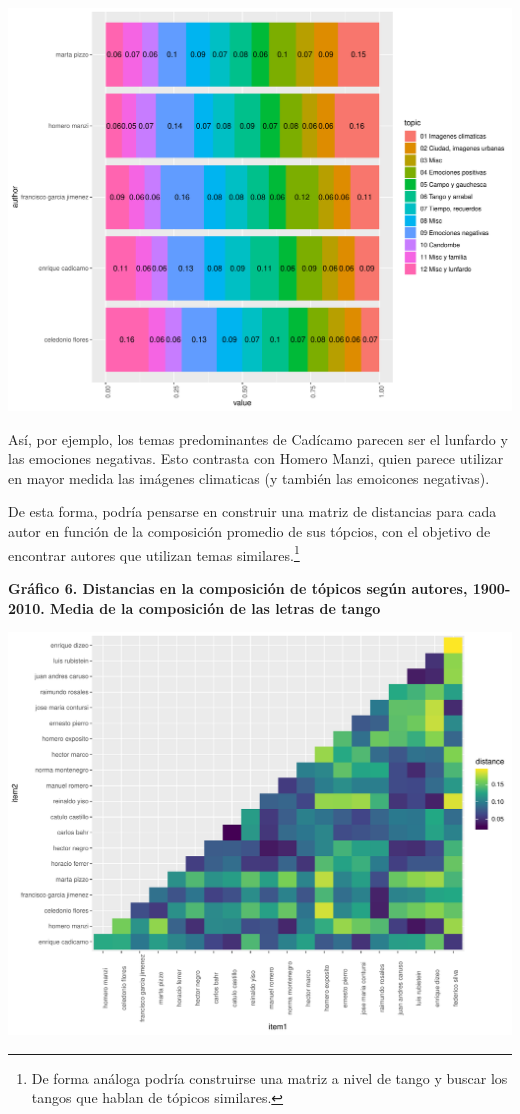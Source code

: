 \documentclass[]{article}
\let\rmarkdownfootnote\footnote%
\def\footnote{\protect\rmarkdownfootnote}
\begin{document}
\includegraphics{Notebook_files/figure-latex/unnamed-chunk-5-1.pdf}

Así, por ejemplo, los temas predominantes de Cadícamo parecen ser el
lunfardo y las emociones negativas. Esto contrasta con Homero Manzi,
quien parece utilizar en mayor medida las imágenes climaticas (y también
las emoicones negativas).

De esta forma, podría pensarse en construir una matriz de distancias
para cada autor en función de la composición promedio de sus tópcios,
con el objetivo de encontrar autores que utilizan temas
similares.\footnote{De forma análoga podría construirse una matriz a
  nivel de tango y buscar los tangos que hablan de tópicos similares.}

\textbf{Gráfico 6. Distancias en la composición de tópicos según
autores, 1900-2010. Media de la composición de las letras de tango}

\includegraphics{Notebook_files/figure-latex/unnamed-chunk-6-1.pdf}
\end{document}
